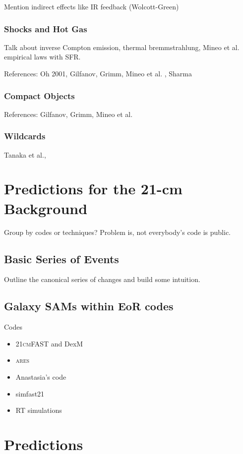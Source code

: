 Mention indirect effects like IR feedback (Wolcott-Green)


\subsubsection{Shocks and Hot Gas}
Talk about inverse Compton emission, thermal bremmstrahlung, Mineo et al. empirical laws with SFR.

References: Oh 2001, Gilfanov, Grimm, Mineo et al. , Sharma


\subsubsection{Compact Objects}
References: Gilfanov, Grimm, Mineo et al. 

\subsubsection{Wildcards}

Tanaka et al., 



\section{Predictions for the 21-cm Background} \label{sec:predictions}
Group by codes or techniques? Problem is, not everybody's code is public.




\subsection{Basic Series of Events}
Outline the canonical series of changes and build some intuition.



\subsection{}





\subsection{Galaxy SAMs within EoR codes}
Codes
\begin{itemize}
	\item \textsc{21cmFAST} and DexM
	\item \textsc{ares}
	\item Anastasia's code
	\item simfast21
	\item RT simulations
\end{itemize}


\section{Predictions} 






